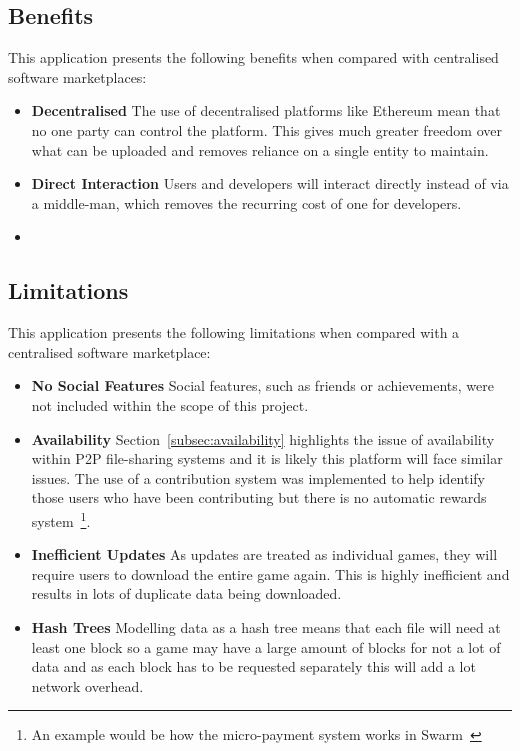
\subsection{Benefits}

This application presents the following benefits when compared with centralised software marketplaces:

\begin{itemize}
  \item \textbf{Decentralised} The use of decentralised platforms like Ethereum mean that no one party can control the platform. This gives much greater freedom over what can be uploaded and removes reliance on a single entity to maintain.
  \item \textbf{Direct Interaction} Users and developers will interact directly instead of via a middle-man, which removes the recurring cost of one for developers.
  \item \textbf{}
\end{itemize}

\subsection{Limitations}

This application presents the following limitations when compared with a centralised software marketplace:

\begin{itemize}
  \item \textbf{No Social Features} Social features, such as friends or achievements, were not included within the scope of this project.
  \item \textbf{Availability} Section~\ref{subsec:availability} highlights the issue of availability within P2P file-sharing systems and it is likely this platform will face similar issues.
  The use of a contribution system was implemented to help identify those users who have been contributing but there is no automatic rewards system~\footnote{An example would be how the micro-payment system works in Swarm~\cite{hartman_swarm_1999}}.
  \item \textbf{Inefficient Updates} As updates are treated as individual games, they will require users to download the entire game again. This is highly inefficient and results in lots of duplicate data being downloaded.
  \item \textbf{Hash Trees} Modelling data as a hash tree means that each file will need at least one block so a game may have a large amount of blocks for not a lot of data and as each block has to be requested separately this will add a lot network overhead. 
\end{itemize}